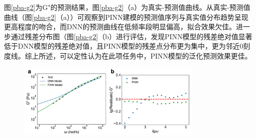 图\ref{pba-g2}为G"的预测结果，图\ref{pba-g2}（a）为真实-预测值曲线。从真实-预测值曲线（图\ref{pba-g2}（a））可观察到PINN建模的预测值序列与真实值分布趋势呈现更高程度的吻合，而DNN的预测曲线在低频率段明显偏高，拟合效果欠佳。进一步通过残差分布图（图\ref{pba-g2}（b）进行评估，发现PINN模型的残差绝对值显著低于DNN模型的残差绝对值，且PINN模型的残差点分布更为集中，更为邻近0刻度线。综上所述，可以定性认为在此项任务中，PINN模型的泛化预测效果更佳。
\begin{figure}[htbp]
  \centering
  \includegraphics[width=0.8\textwidth]{Fig/pba-g2.pdf}
\end{figure}

